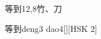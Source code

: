 \begin{entry}{等到}{12,8}{⽵、⼑}
  \begin{phonetics}{等到}{deng3 dao4}[][HSK 2]
  \end{phonetics}
\end{entry}
